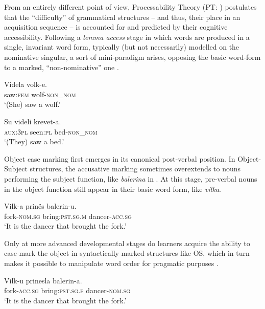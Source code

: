 \documentclass[output=paper,            colorlinks, citecolor=brown            		  ]{langscibook}
\begin{document}
From an entirely different point of view, Processability Theory (PT: \citealt{Pienemann1998, DiBiaseBettoni2015}) postulates that the “difficulty” of grammatical structures -- and thus, their place in an acquisition sequence -- is accounted for and predicted by their cognitive accessibility. Following a \textit{lemma access} stage in which words are produced in a single, invariant word form, typically (but not necessarily) modelled on the nominative singular, a sort of mini-paradigm \citep{BittnerEtAl2000} arises, opposing the basic word-form to a marked, “non-nominative” one .

\ea\label{ex:saturno:8}  
    \ea\label{ex:saturno:8a}
    \gll Videla    volk-e.\\
    saw:\textsc{fem}  wolf-\textsc{non\_nom}\\ 
    \glt ‘(She) saw a wolf.’

    \ex\label{ex:saturno:8b}
    \gll Su    videli    krevet-a.\\
    \textsc{aux:3pl}  seen:\textsc{pl}  bed-\textsc{non\_nom}\\ 
    \glt ‘(They) saw a bed.’
    \z
\z

Object case marking first emerges in its canonical post-verbal position. In Ob\-ject-Subject structures, the accusative marking sometimes overextends to nouns performing the subject function, like \textit{balerina} in . At this stage, pre-verbal nouns in the object function still appear in their basic word form, like \textit{vilka}.

\ea\label{ex:saturno:9}  
\gll Vilk-a     prinës     balerin-u.\\
fork-\textsc{nom.sg}  bring:\textsc{pst.sg.m}  dancer-\textsc{acc.sg}\\ 
\glt ‘It is the dancer that brought the fork.’
\z

Only at more advanced developmental stages do learners acquire the ability to case-mark the object in syntactically marked structures like OS, which in turn makes it possible to manipulate word order for pragmatic purposes .

\ea\label{ex:saturno:10}  
\gll Vilk-u     prinesla     balerin-a.\\
fork-\textsc{acc.sg}  bring:\textsc{pst.sg.f}  dancer-\textsc{nom.sg}\\ 
\glt ‘It is the dancer that brought the fork.’
\z
\end{document}
